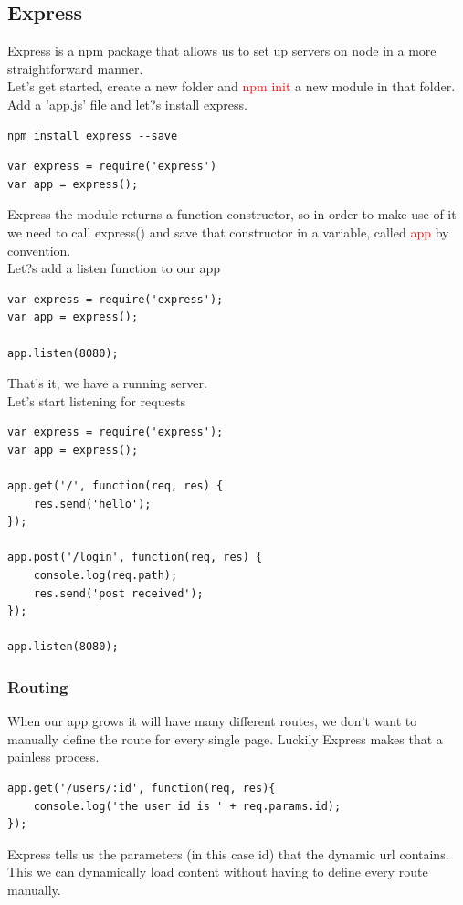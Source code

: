 \documentclass[a4paper]{article}
\begin{document}
\subsection{Express}
Express is a npm package that allows us to set up servers on node in a more straightforward manner.\\

Let's get started, create a new folder and \textcolor{red}{npm init} a new module in that folder. Add a 'app.js' file and let?s install express.
\begin{lstlisting}
npm install express --save
\end{lstlisting}
\begin{lstlisting}
var express = require('express')
var app = express();
\end{lstlisting}
Express the module returns a function constructor, so in order to make use of it we need to call express() and save that constructor in a variable, called \textcolor{red}{app} by convention.
\\
Let?s add a listen function to our app
\begin{lstlisting}
var express = require('express');
var app = express();

app.listen(8080);
\end{lstlisting}
That's it, we have a running server.\\
Let's start listening for requests
\begin{lstlisting}
var express = require('express');
var app = express();

app.get('/', function(req, res) {
    res.send('hello');
});

app.post('/login', function(req, res) {
    console.log(req.path);
    res.send('post received');
});

app.listen(8080);
\end{lstlisting} 

\subsubsection{Routing}
When our app grows it will have many different routes, we don't want to manually define the route for every single page. Luckily Express makes that a painless process.
\begin{lstlisting}
app.get('/users/:id', function(req, res){
    console.log('the user id is ' + req.params.id);
});
\end{lstlisting}
Express tells us the parameters (in this case id) that the dynamic url contains. This we can dynamically load content without having to define every route manually.
\end{document}

